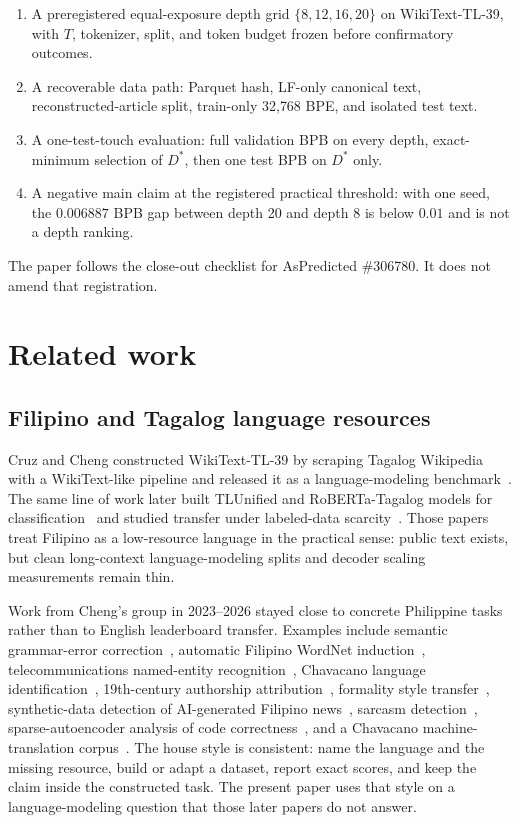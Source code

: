 \documentclass[11pt,a4paper]{article}
\begin{document}
\begin{enumerate}
\item A preregistered equal-exposure depth grid $\{8,12,16,20\}$ on WikiText-TL-39, with $T$, tokenizer, split, and token budget frozen before confirmatory outcomes.
\item A recoverable data path: Parquet hash, LF-only canonical text, reconstructed-article split, train-only 32{,}768 BPE, and isolated test text.
\item A one-test-touch evaluation: full validation BPB on every depth, exact-minimum selection of $D^{\ast}$, then one test BPB on $D^{\ast}$ only.
\item A negative main claim at the registered practical threshold: with one seed, the $0.006887$ BPB gap between depth 20 and depth 8 is below $0.01$ and is not a depth ranking.
\end{enumerate}

The paper follows the close-out checklist for AsPredicted \#306780. It does not amend that registration.

\section{Related work}
\label{sec:related}

\subsection{Filipino and Tagalog language resources}
Cruz and Cheng constructed WikiText-TL-39 by scraping Tagalog Wikipedia with a WikiText-like pipeline and released it as a language-modeling benchmark~\cite{cruz2019eval}. The same line of work later built TLUnified and RoBERTa-Tagalog models for classification~\cite{cruz2022tlunified} and studied transfer under labeled-data scarcity~\cite{cruz2020fakenews}. Those papers treat Filipino as a low-resource language in the practical sense: public text exists, but clean long-context language-modeling splits and decoder scaling measurements remain thin.

Work from Cheng's group in 2023--2026 stayed close to concrete Philippine tasks rather than to English leaderboard transfer. Examples include semantic grammar-error correction~\cite{espiritu2023balarila}, automatic Filipino WordNet induction~\cite{velasco2023wordnet}, telecommunications named-entity recognition~\cite{chan2023ner}, Chavacano language identification~\cite{vicente2024vardial}, 19th-century authorship attribution~\cite{espiritu2024aa}, formality style transfer~\cite{loquinte2024formality}, synthetic-data detection of AI-generated Filipino news~\cite{ong2025aigenerated}, sarcasm detection~\cite{marcellana2025sarcasm}, sparse-autoencoder analysis of code correctness~\cite{tahimic2025sae}, and a Chavacano machine-translation corpus~\cite{vicente2026chavacano}. The house style is consistent: name the language and the missing resource, build or adapt a dataset, report exact scores, and keep the claim inside the constructed task. The present paper uses that style on a language-modeling question that those later papers do not answer.
\end{document}
